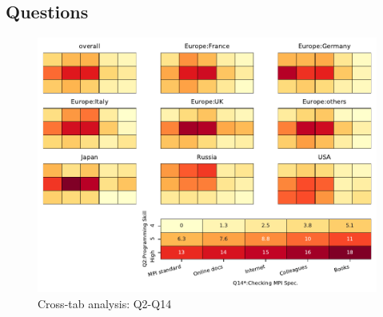 
\subsection{Questions}


\begin{figure}
\begin{center}
\includegraphics[width=12cm]{../pdfs/Q2-Q14.pdf}
\caption{Cross-tab analysis: Q2-Q14}
\label{fig:Q2-Q14}
\end{center}
\end{figure}
